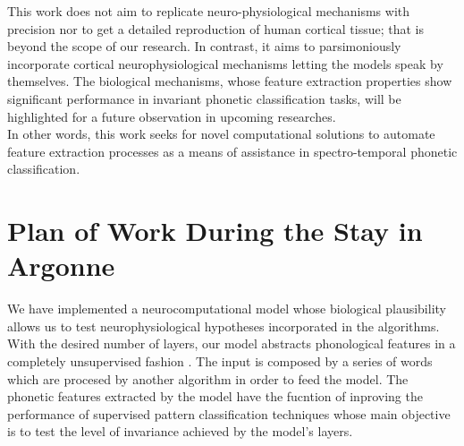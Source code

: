 \documentclass[11pt,a4paper]{article}
\begin{document}
This work does not aim to replicate 
neuro-physiological mechanisms with precision nor to get a detailed reproduction
of human cortical tissue; that is beyond the scope of our research. 
In contrast, it aims to parsimoniously incorporate cortical
neurophysiological mechanisms letting the models
speak by themselves.
The biological mechanisms, whose feature extraction
properties show significant performance
in invariant phonetic classification tasks, will be
highlighted for a future observation in upcoming researches. \\

In other words, this work seeks for novel computational solutions
to automate feature extraction processes as a means
of assistance in spectro-temporal phonetic classification. \\




















\section{Plan of Work During the Stay in Argonne}

We have implemented a neurocomputational model whose biological plausibility
allows us to test neurophysiological hypotheses incorporated in the algorithms.
With the desired number of layers, our model abstracts phonological features
in a completely unsupervised fashion .
The input is composed by a series of words which are procesed by another algorithm
in order to feed  the model.
The phonetic features extracted by the model have the fucntion of inproving
the performance of supervised pattern classification techniques
whose main objective is to test the level of invariance achieved by the model's layers. \\
\end{document}
